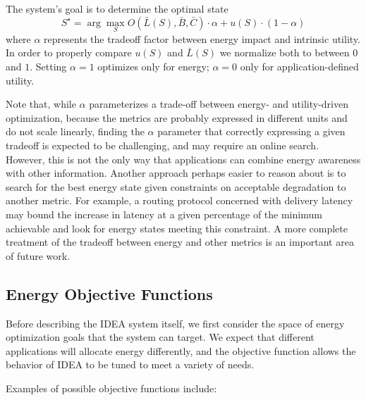 The system's goal is to determine the optimal state \[ S^\star = \arg
\max_{S} O(\bar{L}(S), \bar{B}, \bar{C}) \cdot \alpha + u(S) \cdot
(1-\alpha)\] where $\alpha$ represents the tradeoff factor between energy
impact and intrinsic utility. In order to properly compare $u(S)$ and
$\bar{L}(S)$ we normalize both to between $0$ and $1$. Setting $\alpha=1$
optimizes only for energy; $\alpha=0$ only for application-defined utility.

Note that, while $\alpha$ parameterizes a trade-off between energy- and
utility-driven optimization, because the metrics are probably expressed in
different units and do not scale linearly, finding the $\alpha$ parameter
that correctly expressing a given tradeoff is expected to be challenging, and
may require an online search. However, this is not the only way that
applications can combine energy awareness with other information. Another
approach perhaps easier to reason about is to search for the best energy
state given constraints on acceptable degradation to another metric. For
example, a routing protocol concerned with delivery latency may bound the
increase in latency at a given percentage of the minimum achievable and look
for energy states meeting this constraint. A more complete treatment of the
tradeoff between energy and other metrics is an important area of future
work.

\subsection{Energy Objective Functions}
\label{idea-subsec-energyobjectivefunctions}

Before describing the IDEA system itself, we first consider the space of
energy optimization goals that the system can target. We expect that
different applications will allocate energy differently, and the objective
function allows the behavior of IDEA to be tuned to meet a variety of needs.

Examples of possible objective functions include:

